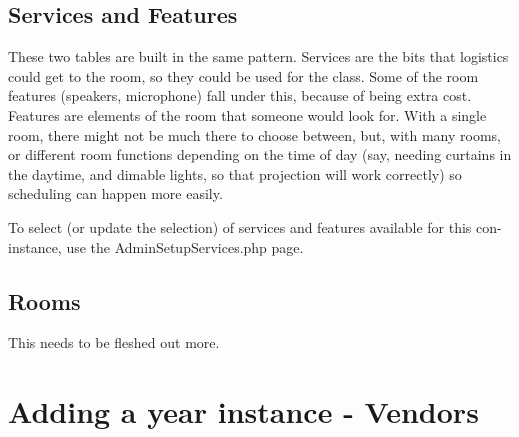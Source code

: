 \documentclass[captions=tablesignature]{scrartcl}
\begin{document}
\subsection{Services and Features}
\label{sec-13-2}
These two tables are built in the same pattern.  Services are the
bits that logistics could get to the room, so they could be used
for the class.  Some of the room features (speakers, microphone)
fall under this, because of being extra cost.  Features are
elements of the room that someone would look for.  With a single
room, there might not be much there to choose between, but, with
many rooms, or different room functions depending on the time of
day (say, needing curtains in the daytime, and dimable lights, so
that projection will work correctly) so scheduling can happen more
easily.

To select (or update the selection) of services and features
available for this con-instance, use the AdminSetupServices.php
page.
\subsection{Rooms}
\label{sec-13-3}
This needs to be fleshed out more.

\section{Adding a year instance - Vendors}
\label{sec-14}
\end{document}
